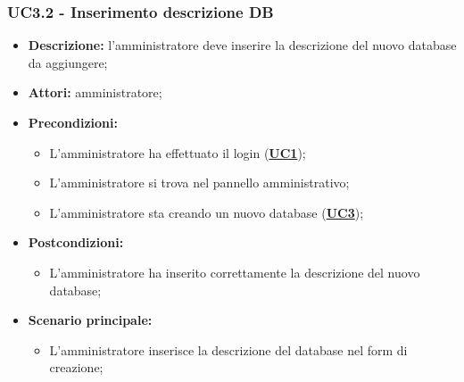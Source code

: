 \documentclass[5pt]{article}
\begin{document}
\subsubsection{UC3.2 - Inserimento descrizione DB}
\label{sec:UC3.2}
\begin{itemize}
	\item \textbf{Descrizione:} l’amministratore deve inserire la descrizione del nuovo database da aggiungere;
	\item \textbf{Attori:} amministratore;
	\item \textbf{Precondizioni:} 
	\begin{itemize}
		\item L’amministratore ha effettuato il login (\hyperref[sec:UC1]{\textbf{UC1}});
		\item L’amministratore si trova nel pannello amministrativo;
		\item L’amministratore sta creando un nuovo database (\hyperref[sec:UC3]{\textbf{UC3}});
	\end{itemize}
	\item \textbf{Postcondizioni:} 
	\begin{itemize}
		\item L'amministratore ha inserito correttamente la descrizione del nuovo database;
	\end{itemize}
	\item \textbf{Scenario principale:} 
	\begin{itemize}
		\item L’amministratore inserisce la descrizione del database nel form di creazione;
	\end{itemize}
\end{itemize}
\end{document}
